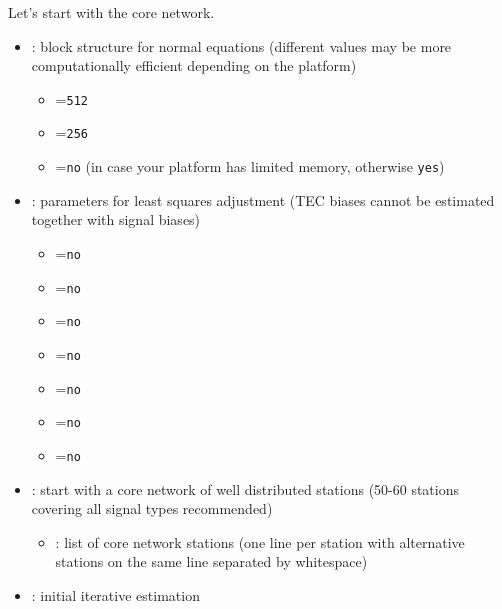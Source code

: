 Let's start with the core network.
\begin{itemize}
  \item {}:
      block structure for normal equations (different values may be more computationally efficient depending on the platform)
  \begin{itemize}
    \item {}=\verb|512|
    \item {}=\verb|256|
    \item {}=\verb|no| (in case your platform has limited memory, otherwise \verb|yes|)
  \end{itemize}
  \item {}: parameters
        for least squares adjustment (TEC biases cannot be estimated together with signal biases)
  \begin{itemize}
    \item {}=\verb|no|
    \item {}=\verb|no|
    \item {}=\verb|no|
    \item {}=\verb|no|
    \item {}=\verb|no|
    \item {}=\verb|no|
    \item {}=\verb|no|
  \end{itemize}
  \item {}: start with a
        core network of well distributed stations (50-60 stations covering all signal types recommended)
  \begin{itemize}
    \item {}: list of core network stations (one line per station
          with alternative stations on the same line separated by whitespace)
  \end{itemize}
  \item {}: initial iterative estimation

\end{itemize}
